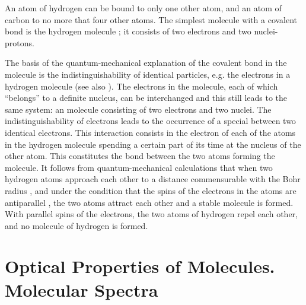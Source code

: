 An atom of hydrogen can be bound to only one other atom, and
an atom of carbon to no more that four other atoms. The simplest molecule with a covalent bond is the hydrogen molecule ; it consists of two electrons and two nuclei-protons. 

The basis of the quantum-mechanical explanation of the covalent bond in the  molecule is the indistinguishability of identical particles, e.g. the electrons in a hydrogen molecule (see also ). The electrons in the  molecule, each of which ``belongs'' to a definite nucleus, can be interchanged and this still leads to the same system: an  molecule consisting of two electrons and two nuclei. The indistinguishability of electrons leads to the occurrence of a special  between two identical electrons. This interaction consists in the electron of each of the atoms in the hydrogen molecule spending a certain part of its time at the nucleus of the other atom. This constitutes the bond between the two atoms forming the molecule. It follows from quantum-mechanical calculations that when two hydrogen atoms approach each other to a distance commensurable with the Bohr radius , and under the condition that the spins of the electrons in the atoms are antiparallel
, the two atoms attract each other and a stable
 molecule is formed. With parallel spins of the electrons, the two atoms of hydrogen repel each other, and no molecule of hydrogen
is formed.

\section{Optical Properties of Molecules. Molecular Spectra}
\label{sec-39.5} 


